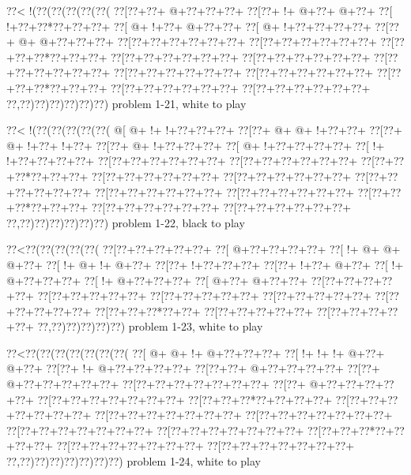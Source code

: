 \vbox{\vbox{\goo
\0??<\- !(\0??(\0??(\0??(\0??(\0??(
\0??[\0??+\0??+\- @+\0??+\0??+\0??+
\0??[\0??+\- !+\- @+\0??+\- @+\0??+
\0??[\- !+\0??+\0??*\0??+\0??+\0??+
\0??[\- @+\- !+\0??+\- @+\0??+\0??+
\0??[\- @+\- !+\0??+\0??+\0??+\0??+
\0??[\0??+\- @+\- @+\0??+\0??+\0??+
\0??[\0??+\0??+\0??+\0??+\0??+\0??+
\0??[\0??+\0??+\0??+\0??+\0??+\0??+
\0??[\0??+\0??+\0??*\0??+\0??+\0??+
\0??[\0??+\0??+\0??+\0??+\0??+\0??+
\0??[\0??+\0??+\0??+\0??+\0??+\0??+
\0??[\0??+\0??+\0??+\0??+\0??+\0??+
\0??[\0??+\0??+\0??+\0??+\0??+\0??+
\0??[\0??+\0??+\0??+\0??+\0??+\0??+
\0??[\0??+\0??+\0??*\0??+\0??+\0??+
\0??[\0??+\0??+\0??+\0??+\0??+\0??+
\0??[\0??+\0??+\0??+\0??+\0??+\0??+
\0??,\0??)\0??)\0??)\0??)\0??)\0??)
}
\hfil problem 1-21, white to play\hfil\break
}

\vbox{\vbox{\goo
\0??<\- !(\0??(\0??(\0??(\0??(\0??(
\- @[\- @+\- !+\- !+\0??+\0??+\0??+
\0??[\0??+\- @+\- @+\- !+\0??+\0??+
\0??[\0??+\- @+\- !+\0??+\- !+\0??+
\0??[\0??+\- @+\- !+\0??+\0??+\0??+
\0??[\- @+\- !+\0??+\0??+\0??+\0??+
\0??[\- !+\- !+\0??+\0??+\0??+\0??+
\0??[\0??+\0??+\0??+\0??+\0??+\0??+
\0??[\0??+\0??+\0??+\0??+\0??+\0??+
\0??[\0??+\0??+\0??*\0??+\0??+\0??+
\0??[\0??+\0??+\0??+\0??+\0??+\0??+
\0??[\0??+\0??+\0??+\0??+\0??+\0??+
\0??[\0??+\0??+\0??+\0??+\0??+\0??+
\0??[\0??+\0??+\0??+\0??+\0??+\0??+
\0??[\0??+\0??+\0??+\0??+\0??+\0??+
\0??[\0??+\0??+\0??*\0??+\0??+\0??+
\0??[\0??+\0??+\0??+\0??+\0??+\0??+
\0??[\0??+\0??+\0??+\0??+\0??+\0??+
\0??,\0??)\0??)\0??)\0??)\0??)\0??)
}
\hfil problem 1-22, black to play\hfil\break
}

\vbox{\vbox{\goo
\0??<\0??(\0??(\0??(\0??(\0??(
\0??[\0??+\0??+\0??+\0??+\0??+
\0??[\- @+\0??+\0??+\0??+\0??+
\0??[\- !+\- @+\- @+\- @+\0??+
\0??[\- !+\- @+\- !+\- @+\0??+
\0??[\0??+\- !+\0??+\0??+\0??+
\0??[\0??+\- !+\0??+\- @+\0??+
\0??[\- !+\- @+\0??+\0??+\0??+
\0??[\- !+\- @+\0??+\0??+\0??+
\0??[\- @+\0??+\- @+\0??+\0??+
\0??[\0??+\0??+\0??+\0??+\0??+
\0??[\0??+\0??+\0??+\0??+\0??+
\0??[\0??+\0??+\0??+\0??+\0??+
\0??[\0??+\0??+\0??+\0??+\0??+
\0??[\0??+\0??+\0??+\0??+\0??+
\0??[\0??+\0??+\0??*\0??+\0??+
\0??[\0??+\0??+\0??+\0??+\0??+
\0??[\0??+\0??+\0??+\0??+\0??+
\0??,\0??)\0??)\0??)\0??)\0??)
}
\hfil problem 1-23, white to play\hfil\break
}

\vbox{\vbox{\goo
\0??<\0??(\0??(\0??(\0??(\0??(\0??(\0??(
\0??[\- @+\- @+\- !+\- @+\0??+\0??+\0??+
\0??[\- !+\- !+\- !+\- @+\0??+\- @+\0??+
\0??[\0??+\- !+\- @+\0??+\0??+\0??+\0??+
\0??[\0??+\0??+\- @+\0??+\0??+\0??+\0??+
\0??[\0??+\- @+\0??+\0??+\0??+\0??+\0??+
\0??[\0??+\0??+\0??+\0??+\0??+\0??+\0??+
\0??[\0??+\- @+\0??+\0??+\0??+\0??+\0??+
\0??[\0??+\0??+\0??+\0??+\0??+\0??+\0??+
\0??[\0??+\0??+\0??*\0??+\0??+\0??+\0??+
\0??[\0??+\0??+\0??+\0??+\0??+\0??+\0??+
\0??[\0??+\0??+\0??+\0??+\0??+\0??+\0??+
\0??[\0??+\0??+\0??+\0??+\0??+\0??+\0??+
\0??[\0??+\0??+\0??+\0??+\0??+\0??+\0??+
\0??[\0??+\0??+\0??+\0??+\0??+\0??+\0??+
\0??[\0??+\0??+\0??*\0??+\0??+\0??+\0??+
\0??[\0??+\0??+\0??+\0??+\0??+\0??+\0??+
\0??[\0??+\0??+\0??+\0??+\0??+\0??+\0??+
\0??,\0??)\0??)\0??)\0??)\0??)\0??)\0??)
}
\hfil problem 1-24, white to play\hfil\break
}

